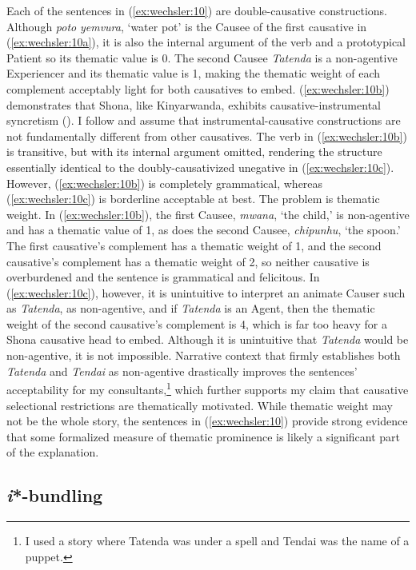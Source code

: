 \documentclass[output=paper,modfonts,nonflat,colorlinks,citecolor=brown]{langsci/langscibook}
\begin{document}
Each of the sentences in (\ref{ex:wechsler:10}) are double-causative constructions. Although \textit{poto} \textit{yemvura}, ‘water pot’ is the Causee of the first causative in (\ref{ex:wechsler:10a}), it is also the internal argument of the verb and a prototypical Patient so its thematic value is 0. The second Causee \textit{Tatenda} is a non-agentive Experiencer and its thematic value is 1, making the thematic weight of each complement acceptably light for both causatives to embed. (\ref{ex:wechsler:10b}) demonstrates that Shona, like Kinyarwanda, exhibits causative-instrumental syncretism (\citealt{Kimenyi1980,Kimenyi1995,Peterson2007,Jerro2013}). I follow \citet{Jerro2013} and assume that instrumental-causative constructions are not fundamentally different from other causatives. The verb in (\ref{ex:wechsler:10b}) is transitive, but with its internal argument omitted, rendering the structure essentially identical to the doubly-causativized unegative in (\ref{ex:wechsler:10c}). However, (\ref{ex:wechsler:10b}) is completely grammatical, whereas (\ref{ex:wechsler:10c}) is borderline acceptable at best. The problem is thematic weight. In (\ref{ex:wechsler:10b}), the first Causee, \textit{mwana}, ‘the child,’ is non-agentive and has a thematic value of 1, as does the second Causee, \textit{chipunhu}, ‘the spoon.’ The first causative’s complement has a thematic weight of 1, and the second causative’s complement has a thematic weight of 2, so neither causative is overburdened and the sentence is grammatical and felicitous. In (\ref{ex:wechsler:10c}), however, it is unintuitive to interpret an animate Causer such as \textit{Tatenda}, as non-agentive, and if \textit{Tatenda} is an Agent, then the thematic weight of the second causative’s complement is 4, which is far too heavy for a Shona causative head to embed. Although it is unintuitive that \textit{Tatenda} would be non-agentive, it is not impossible. Narrative context that firmly establishes both \textit{Tatenda} and \textit{Tendai} as non-agentive drastically improves the sentences' acceptability for my consultants,\footnote{I used a story where Tatenda was under a spell and Tendai was the name of a puppet.} which further supports my claim that causative selectional restrictions are thematically motivated. While thematic weight may not be the whole story, the sentences in (\ref{ex:wechsler:10}) provide strong evidence that some formalized measure of thematic prominence is likely a significant part of the explanation.\\

\subsection{\textit{i}*-bundling}\label{sec:wechsler:2.4}
\end{document}
